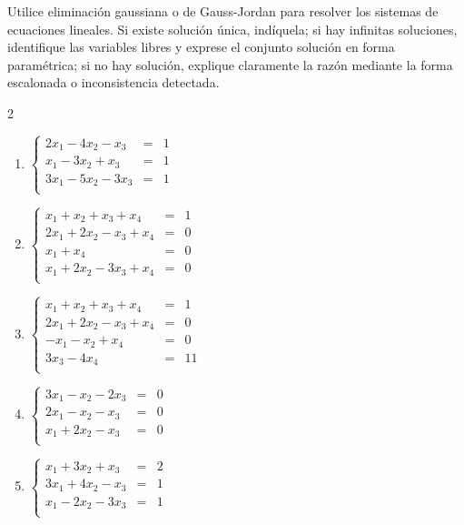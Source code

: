 \begin{prob} Utilice eliminación gaussiana o de Gauss-Jordan para resolver los sistemas de ecuaciones lineales. Si existe solución única, indíquela; si hay infinitas soluciones, identifique las variables libres y exprese el conjunto solución en forma paramétrica; si no hay solución, explique claramente la razón mediante la forma escalonada o inconsistencia detectada.
\begin{multicols}{2}
\begin{enumerate}[$a)$]
   \item  $\left\lbrace \begin{array}{ccc}
2x_1-4x_2-x_3&=&1\\
x_1-3x_2+x_3&=&1\\
3x_1-5x_2-3x_3&=&1\\
\end{array} \right. $

	\item $\left\lbrace \begin{array}{ccc}
	x_1+x_2+x_3+x_4&=&1\\
	2x_1+2x_2-x_3+x_4&=&0\\
	x_1+x_4&=&0\\
	x_1+2x_2-3x_3+x_4&=&0\\
	\end{array} \right. $

	\item $\left\lbrace \begin{array}{ccc}
	x_1+x_2+x_3+x_4&=&1\\
	2x_1+2x_2-x_3+x_4&=&0\\
	-x_1-x_2+x_4&=&0\\
	3x_3-4x_4&=&11\\
	\end{array} \right.  $
	
	\item $\left\lbrace \begin{array}{ccc}
	3x_1-x_2-2x_3&=&0\\
2x_1-x_2-x_3&=&0\\
x_1+2x_2-x_3&=&0\\
	\end{array} \right. $
	
	
		\item $\left\lbrace \begin{array}{ccc}
	x_1+3x_2+x_3&=&2\\
	3x_1+4x_2-x_3&=&1\\
	x_1-2x_2-3x_3&=&1\\
	\end{array} \right. $
	

\end{enumerate}
\end{multicols}
\end{prob}
